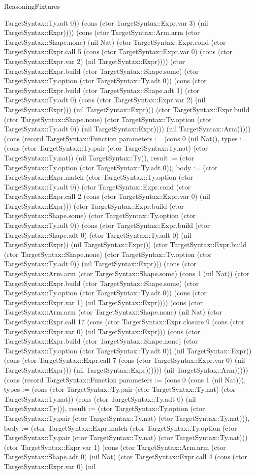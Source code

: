 \begin{lexlean}{ReasoningFixtures}
\begin{semanticmodule}
{TargetSyntax::Ty.adt 0)) (cons (ctor TargetSyntax::Expr.var 3) (nil TargetSyntax::Expr)))) (cons (ctor TargetSyntax::Arm.arm (ctor TargetSyntax::Shape.none) (nil Nat) (ctor TargetSyntax::Expr.cond (ctor TargetSyntax::Expr.call 5 (cons (ctor TargetSyntax::Expr.var 0) (cons (ctor TargetSyntax::Expr.var 2) (nil TargetSyntax::Expr)))) (ctor TargetSyntax::Expr.build (ctor TargetSyntax::Shape.some) (ctor TargetSyntax::Ty.option (ctor TargetSyntax::Ty.adt 0)) (cons (ctor TargetSyntax::Expr.build (ctor TargetSyntax::Shape.adt 1) (ctor TargetSyntax::Ty.adt 0) (cons (ctor TargetSyntax::Expr.var 2) (nil TargetSyntax::Expr))) (nil TargetSyntax::Expr))) (ctor TargetSyntax::Expr.build (ctor TargetSyntax::Shape.none) (ctor TargetSyntax::Ty.option (ctor TargetSyntax::Ty.adt 0)) (nil TargetSyntax::Expr)))) (nil TargetSyntax::Arm))))}) (cons (record TargetSyntax::Function {parameters := (cons 0 (nil Nat)), types := (cons (ctor TargetSyntax::Ty.pair (ctor TargetSyntax::Ty.nat) (ctor TargetSyntax::Ty.nat)) (nil TargetSyntax::Ty)), result := (ctor TargetSyntax::Ty.option (ctor TargetSyntax::Ty.adt 0)), body := (ctor TargetSyntax::Expr.match (ctor TargetSyntax::Ty.option (ctor TargetSyntax::Ty.adt 0)) (ctor TargetSyntax::Expr.cond (ctor TargetSyntax::Expr.call 2 (cons (ctor TargetSyntax::Expr.var 0) (nil TargetSyntax::Expr))) (ctor TargetSyntax::Expr.build (ctor TargetSyntax::Shape.some) (ctor TargetSyntax::Ty.option (ctor TargetSyntax::Ty.adt 0)) (cons (ctor TargetSyntax::Expr.build (ctor TargetSyntax::Shape.adt 0) (ctor TargetSyntax::Ty.adt 0) (nil TargetSyntax::Expr)) (nil TargetSyntax::Expr))) (ctor TargetSyntax::Expr.build (ctor TargetSyntax::Shape.none) (ctor TargetSyntax::Ty.option (ctor TargetSyntax::Ty.adt 0)) (nil TargetSyntax::Expr))) (cons (ctor TargetSyntax::Arm.arm (ctor TargetSyntax::Shape.some) (cons 1 (nil Nat)) (ctor TargetSyntax::Expr.build (ctor TargetSyntax::Shape.some) (ctor TargetSyntax::Ty.option (ctor TargetSyntax::Ty.adt 0)) (cons (ctor TargetSyntax::Expr.var 1) (nil TargetSyntax::Expr)))) (cons (ctor TargetSyntax::Arm.arm (ctor TargetSyntax::Shape.none) (nil Nat) (ctor TargetSyntax::Expr.call 17 (cons (ctor TargetSyntax::Expr.closure 9 (cons (ctor TargetSyntax::Expr.var 0) (nil TargetSyntax::Expr))) (cons (ctor TargetSyntax::Expr.build (ctor TargetSyntax::Shape.none) (ctor TargetSyntax::Ty.option (ctor TargetSyntax::Ty.adt 0)) (nil TargetSyntax::Expr)) (cons (ctor TargetSyntax::Expr.call 7 (cons (ctor TargetSyntax::Expr.var 0) (nil TargetSyntax::Expr))) (nil TargetSyntax::Expr)))))) (nil TargetSyntax::Arm))))}) (cons (record TargetSyntax::Function {parameters := (cons 0 (cons 1 (nil Nat))), types := (cons (ctor TargetSyntax::Ty.pair (ctor TargetSyntax::Ty.nat) (ctor TargetSyntax::Ty.nat)) (cons (ctor TargetSyntax::Ty.adt 0) (nil TargetSyntax::Ty))), result := (ctor TargetSyntax::Ty.option (ctor TargetSyntax::Ty.pair (ctor TargetSyntax::Ty.nat) (ctor TargetSyntax::Ty.nat))), body := (ctor TargetSyntax::Expr.match (ctor TargetSyntax::Ty.option (ctor TargetSyntax::Ty.pair (ctor TargetSyntax::Ty.nat) (ctor TargetSyntax::Ty.nat))) (ctor TargetSyntax::Expr.var 1) (cons (ctor TargetSyntax::Arm.arm (ctor TargetSyntax::Shape.adt 0) (nil Nat) (ctor TargetSyntax::Expr.call 4 (cons (ctor TargetSyntax::Expr.var 0) (nil }
\end{semanticmodule}
\end{lexlean}

